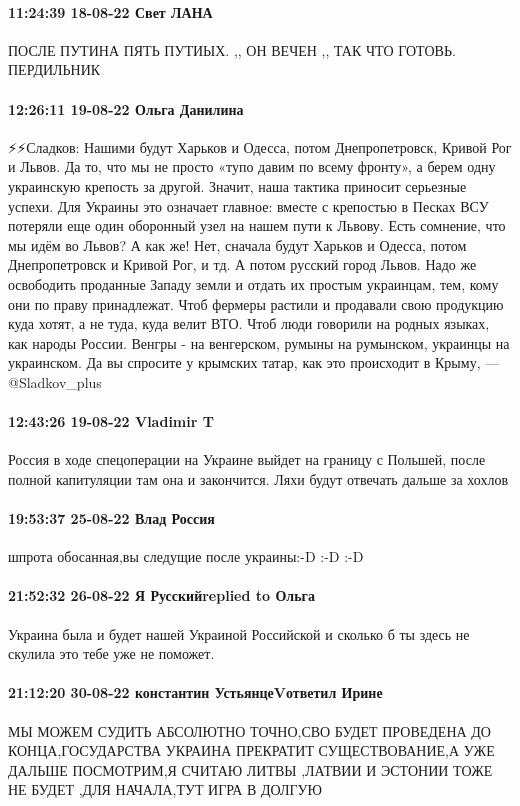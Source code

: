 \paragraph{11:24:39 18-08-22 Свет ЛАНА}

ПОСЛЕ ПУТИНА ПЯТЬ ПУТИЫХ. ,, ОН ВЕЧЕН ,, ТАК ЧТО ГОТОВЬ. ПЕРДИЛЬНИК

\paragraph{12:26:11 19-08-22 Ольга Данилина}

⚡⚡Сладков:
Нашими будут Харьков и Одесса, потом Днепропетровск, Кривой Рог и Львов. Да то, что мы не просто «тупо давим по всему фронту», а берем одну украинскую крепость за другой. Значит, наша тактика приносит серьезные успехи.
Для Украины это означает главное: вместе с крепостью в Песках ВСУ потеряли еще один оборонный узел на нашем пути к Львову.
Есть сомнение, что мы идём во Львов? А как же!
Нет, сначала будут Харьков и Одесса, потом Днепропетровск и Кривой Рог, и тд. А потом русский город Львов.
Надо же освободить проданные Западу земли и отдать их простым украинцам, тем, кому они по праву принадлежат. Чтоб фермеры растили и продавали свою продукцию куда хотят, а не туда, куда велит ВТО.
Чтоб люди говорили на родных языках, как народы России. Венгры - на венгерском, румыны на румынском, украинцы на украинском. Да вы спросите у крымских татар, как это происходит в Крыму, — @Sladkov_plus

\paragraph{12:43:26 19-08-22 Vladimir T}

Россия в ходе спецоперации на Украине выйдет на границу с Польшей, после полной
капитуляции там она и закончится.
Ляхи будут отвечать дальше за хохлов

\paragraph{19:53:37 25-08-22 Влад Россия}

шпрота обосанная,вы следущие после украины:-D :-D :-D

\paragraph{21:52:32 26-08-22 Я Русскийreplied to Ольга}

Украина была и будет нашей Украиной Российской и сколько б ты здесь не скулила
это тебе уже не поможет.

\paragraph{21:12:20 30-08-22 константин УстьянцеVответил Ирине}

МЫ МОЖЕМ СУДИТЬ АБСОЛЮТНО ТОЧНО,СВО БУДЕТ ПРОВЕДЕНА ДО КОНЦА,ГОСУДАРСТВА
УКРАИНА ПРЕКРАТИТ СУЩЕСТВОВАНИЕ,А УЖЕ ДАЛЬШЕ ПОСМОТРИМ,Я СЧИТАЮ ЛИТВЫ ,ЛАТВИИ И
ЭСТОНИИ ТОЖЕ НЕ БУДЕТ ,ДЛЯ НАЧАЛА,ТУТ ИГРА В ДОЛГУЮ

